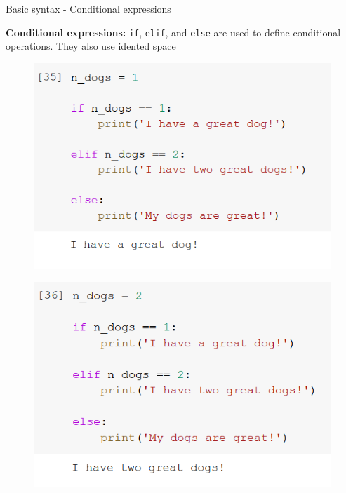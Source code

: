\documentclass[aspectratio=169]{beamer}
\begin{document}
\begin{frame}{Basic syntax - Conditional expressions}

       \textbf{Conditional expressions:}
	\texttt{if}, \texttt{elif}, and \texttt{else} are used to define conditional operations. They also use idented space

	\begin{multicols}{3}

		\begin{figure}
			\centering
			\includegraphics[width=\linewidth]{img/if.png}
		\end{figure}
		\begin{figure}
			\centering
			\includegraphics[width=\linewidth]{img/elif.png}
		\end{figure}
		\begin{figure}
			\centering

\end{figure}
\end{multicols}
\end{frame}
\end{document}
